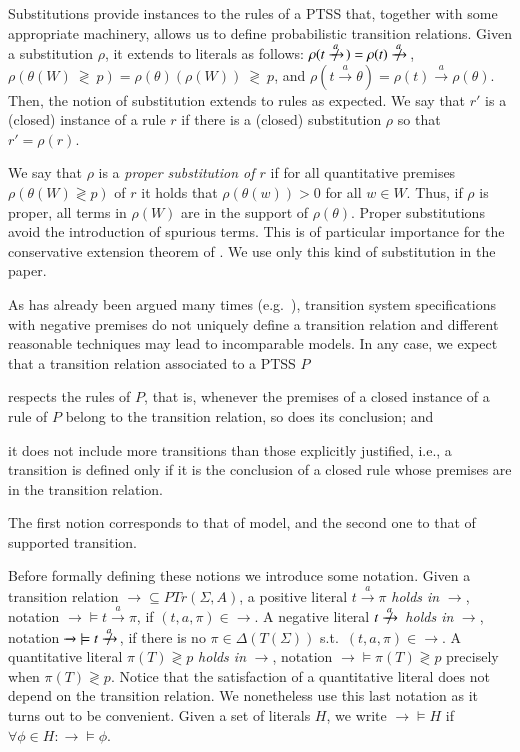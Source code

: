\documentclass[submission,copyright,creativecommons]{eptcs}
\newcommand{\trans}[1][]{\xrightarrow{\, {#1} \, }}
\newcommand{\ntrans}[1][]{\mathrel{{\trans[#1]}\makebox[0em][r]{$\not$\hspace{2ex}}}{\!}}
\newcommand{\closedTerms}{T(\Sigma)}
\newcommand{\PTrn}{\textit{PTr}}
\newcommand{\PTr}{\PTrn(\Sigma, A)}
\begin{document}
Substitutions provide instances to the rules of a PTSS that, together
with some appropriate machinery, allows us to define probabilistic
transition relations.  Given a substitution $\rho$, it extends to
literals as follows:
$\rho(t \ntrans[a]) = \rho(t) \ntrans[a]$, \
$\rho(\theta(W) \ {\gtrless} \ p) = \rho(\theta)(\rho(W)) \ {\gtrless} \ p$, and
$\rho(t \trans[a] \theta) = \rho(t) \trans[a] \rho(\theta)$.
Then, the notion of substitution extends to rules as expected.  We say
that $r'$ is a (closed) instance of a rule $r$ if there is a
(closed) substitution $\rho$ so that $r'=\rho(r)$.


 We say that $\rho$ is a \emph{proper substitution of $r$} if for all
 quantitative premises $\rho(\theta(W) \gtrless p)$ of $r$ it holds that
 $\rho(\theta(w)) > 0$ for all $w\in W$.  Thus, if $\rho$ is proper, all
 terms in $\rho(W)$ are in the support of $\rho(\theta)$.  Proper
 substitutions avoid the introduction of spurious terms.  This is of
 particular importance for the conservative extension theorem of
 \cite[Theorem~14]{DL-fossacs12}.
We use only this kind of substitution in the paper. 



As has already been argued many times (e.g.~\cite{Groote93,BolGroote96,vanGlabbeek04}), transition system
specifications with negative premises do not uniquely define a
transition relation and different reasonable techniques may lead to
incomparable models.
In any case, we expect that a transition relation associated to a PTSS
$P$
\begin{inparaenum}[(i)]
\item respects the rules of $P$, that is, whenever the premises of a
  closed instance of a rule of $P$ belong to the transition relation,
  so does its conclusion; and
\item it does not include more transitions than those explicitly
  justified, i.e., a transition is defined only if it is the conclusion of a
  closed rule whose premises are in the transition relation.
\end{inparaenum}
The first notion corresponds to that of model, and the second one to
that of supported transition.

Before formally defining these notions we introduce some notation.
Given a transition relation ${\trans} \subseteq \PTr$, a positive
literal $t \trans[a]\pi$ \emph{holds in} $\trans$, notation
${\trans} \models t \trans[a]\pi$, if $(t, a, \pi) \in {\trans}$.
A negative literal $t \ntrans[a]$  \emph{holds in} $\trans$,
notation ${\trans} \models t \ntrans[a]$,
if there is no $\pi \in \Delta(\closedTerms)$ s.t.\ $(t, a, \pi) \in {\trans}$.
A quantitative literal $\pi(T) \gtrless p$ \emph{holds in} $\trans$,
notation ${\trans} \models \pi(T) \gtrless p$ precisely when $\pi (T)
\gtrless p$.  Notice that the satisfaction of a quantitative literal
does not
depend on the transition relation. We nonetheless
use this last notation as it turns out to be convenient.
Given a set of literals $H$, we write ${\trans} \models H$
if $\forall \phi \in H: {\trans} \models \phi$.
\end{document}
